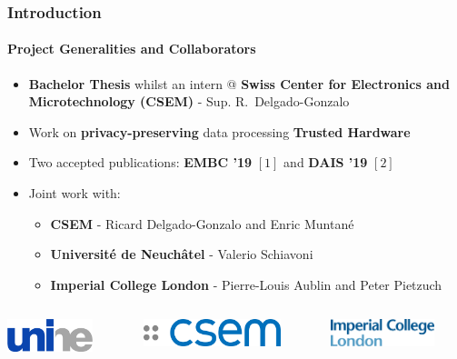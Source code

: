 \documentclass[10pt,    %
    english,            %
    xcolor=table,       %
    envcountsect,        %
    aspectratio=169     %
]{beamer}
\begin{document}
\begin{frame}
    \frametitle{Introduction}
    \framesubtitle{Project Generalities and Collaborators}

    \vspace{-10pt}

    \begin{itemize}
        \item \textbf{Bachelor Thesis} whilst an intern @ \textbf{Swiss Center for Electronics and Microtechnology (CSEM)} - Sup. R.~Delgado-Gonzalo
        \item Work on \textbf{\textcolor{fgRed}{privacy-preserving}} data processing \textrightarrow \textbf{Trusted Hardware}
        \item Two accepted publications: \textbf{EMBC '19} $[1]$ and \textbf{DAIS '19} $[2]$ 
        \item Joint work with:
        \begin{itemize}
            \item \textbf{CSEM} - Ricard Delgado-Gonzalo and Enric Muntan\'e
            \item \textbf{Universit\'e de Neuch\^atel} - Valerio Schiavoni
            \item \textbf{Imperial College London} - Pierre-Louis Aublin and Peter Pietzuch
        \end{itemize}
    \end{itemize}

    \vspace{5pt}

    \begin{columns}[b]
        \centering
        \begin{column}{.2\textwidth}
            \includegraphics[width=2.5cm]{images/unine-no-bg-no-letter.png}
        \end{column}
        \begin{column}{.2\textwidth}
            \hspace*{-30pt}\includegraphics[width=4cm]{images/logo-csem.png}
        \end{column}
        \begin{column}{.2\textwidth}
            \includegraphics[width=3cm]{images/imperial-college.png}
        \end{column}
    \end{columns}


\end{frame}
\end{document}
